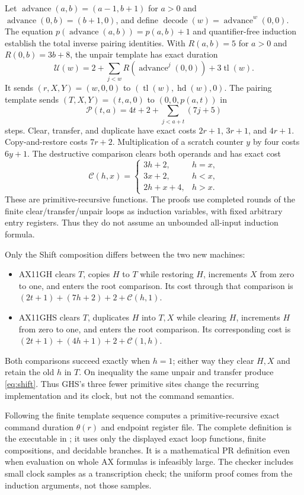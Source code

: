 \documentclass[11pt,a4paper]{article}
\newcommand{\hd}{\operatorname{hd}}
\newcommand{\tl}{\operatorname{tl}}
\newcommand{\file}[1]{\texttt{\path{#1}}}
\begin{document}
Let $\operatorname{advance}(a,b)=(a-1,b+1)$ for $a>0$ and
$\operatorname{advance}(0,b)=(b+1,0)$, and define
$\operatorname{decode}(w)=\operatorname{advance}^{w}(0,0)$.
The equation $p(\operatorname{advance}(a,b))=p(a,b)+1$ and
quantifier-free induction establish the total inverse pairing
identities. With $R(a,b)=5$ for $a>0$ and $R(0,b)=3b+8$, the
unpair template has exact duration
\[
 \mathcal U(w)=
 2+\sum_{j<w}R(\operatorname{advance}^{j}(0,0))+3\tl(w).
\]
It sends $(r,X,Y)=(w,0,0)$ to $(\tl(w),\hd(w),0)$.
The pairing template sends $(T,X,Y)=(t,a,0)$ to
$(0,0,p(a,t))$ in
\[
 \mathcal P(t,a)=4t+2+\sum_{j<a+t}(7j+5)
\]
steps. Clear, transfer, and duplicate have exact costs
$2r+1$, $3r+1$, and $4r+1$. Copy-and-restore costs $7r+2$.
Multiplication of a scratch counter $y$ by four costs $6y+1$.
The destructive comparison clears both operands and has exact cost
\[
 \mathcal C(h,x)=
 \begin{cases}
 3h+2,&h=x,\\
 3x+2,&h<x,\\
 2h+x+4,&h>x.
 \end{cases}
\]
These are primitive-recursive functions. The proofs use completed
rounds of the finite clear/transfer/unpair loops as induction
variables, with fixed arbitrary entry registers. Thus they do not
assume an unbounded all-input induction formula.

Only the Shift composition differs between the two new machines:
\begin{itemize}
\item AX11GH clears $T$, copies $H$ to $T$ while restoring $H$,
increments $X$ from zero to one, and enters the root comparison.
Its cost through that comparison is
$(2t+1)+(7h+2)+2+\mathcal C(h,1)$.
\item AX11GHS clears $T$, duplicates $H$ into $T,X$ while clearing
$H$, increments $H$ from zero to one, and enters the root
comparison. Its corresponding cost is
$(2t+1)+(4h+1)+2+\mathcal C(1,h)$.
\end{itemize}
Both comparisons succeed exactly when $h=1$; either way they clear
$H,X$ and retain the old $h$ in $T$. On inequality the same unpair
and transfer produce \eqref{eq:shift}. Thus GHS's three fewer
primitive sites change the recurring implementation and its clock,
but not the command semantics.

Following the finite template sequence computes a primitive-recursive
exact command duration $\theta(r)$ and endpoint register file.
The complete definition is the executable
\file{command_clock} in \file{check_source_commands.py}; it uses
only the displayed exact loop functions, finite compositions, and
decidable branches. It is a mathematical PR definition even when
evaluation on whole AX formulas is infeasibly large.
The checker includes small clock samples as a transcription check;
the uniform proof comes from the induction arguments, not those
samples.
\end{document}
